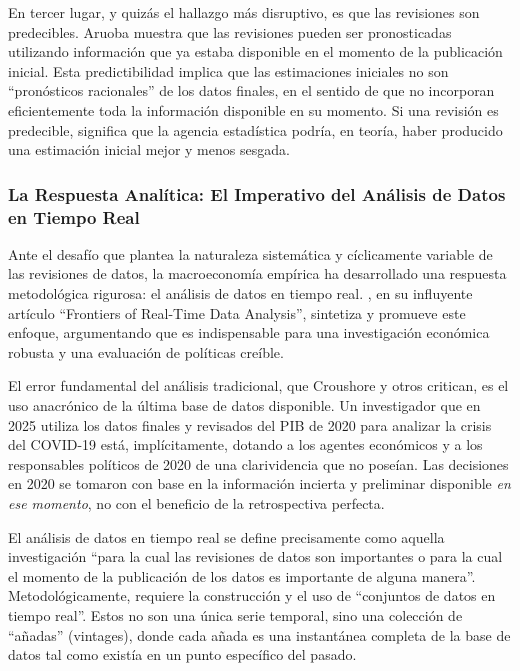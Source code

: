 \documentclass{article}
\begin{document}
En tercer lugar, y quizás el hallazgo más disruptivo, es que las revisiones son predecibles. Aruoba muestra que las revisiones pueden ser pronosticadas utilizando información que ya estaba disponible en el momento de la publicación inicial. Esta predictibilidad implica que las estimaciones iniciales no son ``pronósticos racionales'' de los datos finales, en el sentido de que no incorporan eficientemente toda la información disponible en su momento. Si una revisión es predecible, significa que la agencia estadística podría, en teoría, haber producido una estimación inicial mejor y menos sesgada.

\subsubsection{La Respuesta Analítica: El Imperativo del Análisis de Datos en Tiempo Real}

Ante el desafío que plantea la naturaleza sistemática y cíclicamente variable de las revisiones de datos, la macroeconomía empírica ha desarrollado una respuesta metodológica rigurosa: el análisis de datos en tiempo real. \citet{croushore2011}, en su influyente artículo ``Frontiers of Real-Time Data Analysis'', sintetiza y promueve este enfoque, argumentando que es indispensable para una investigación económica robusta y una evaluación de políticas creíble.

El error fundamental del análisis tradicional, que Croushore y otros critican, es el uso anacrónico de la última base de datos disponible. Un investigador que en 2025 utiliza los datos finales y revisados del PIB de 2020 para analizar la crisis del COVID-19 está, implícitamente, dotando a los agentes económicos y a los responsables políticos de 2020 de una clarividencia que no poseían. Las decisiones en 2020 se tomaron con base en la información incierta y preliminar disponible \textit{en ese momento}, no con el beneficio de la retrospectiva perfecta.

El análisis de datos en tiempo real se define precisamente como aquella investigación ``para la cual las revisiones de datos son importantes o para la cual el momento de la publicación de los datos es importante de alguna manera''. Metodológicamente, requiere la construcción y el uso de ``conjuntos de datos en tiempo real''. Estos no son una única serie temporal, sino una colección de ``añadas'' (vintages), donde cada añada es una instantánea completa de la base de datos tal como existía en un punto específico del pasado.
\end{document}
